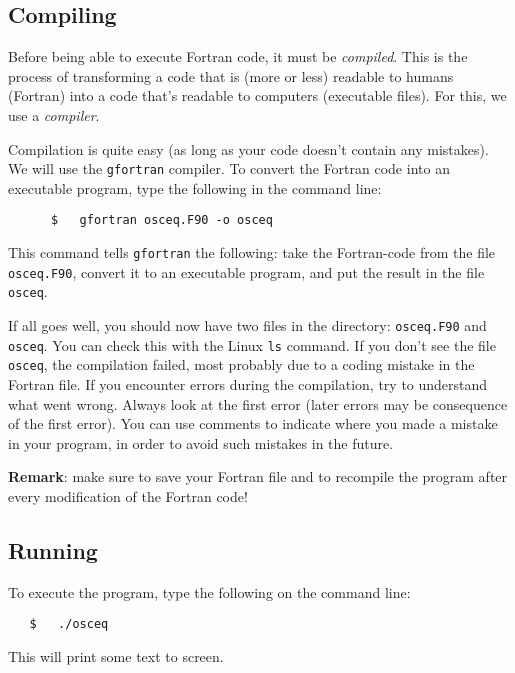 \documentclass[a4paper]{article}
\begin{document}
\subsection{Compiling\label{sec:compile}}
%
\par
Before being able to execute Fortran code, it must be \emph{compiled}. This is the process of transforming a code that is (more or less) readable to humans (Fortran) into a code that's readable to computers (executable files). For this, we use a \emph{compiler}.
%
\par
Compilation is quite easy (as long as your code doesn't contain any mistakes). We will use the \texttt{gfortran} compiler. To convert the Fortran code into an executable program, type the following in the command line:
%
\begin{verbatim}
	  $   gfortran osceq.F90 -o osceq
\end{verbatim}
%
This command tells \verb+gfortran+ the following: take the Fortran-code from the file \verb+osceq.F90+, convert it to an executable program, and put the result in the file \verb+osceq+.
%
\par
If all goes well, you should now have two files in the directory: \verb+osceq.F90+ and \verb+osceq+. You can check this with the Linux \verb+ls+ command. If you don't see the file \verb+osceq+, the compilation failed, most probably due to a coding mistake in the Fortran file. If you encounter errors during the compilation, try to understand what went wrong. Always look at the first error (later errors may be consequence of the first error). You can use comments to indicate where you made a mistake in your program, in order to avoid such mistakes in the future.
%
\par
\textbf{Remark}: make sure to save your Fortran file and to recompile the program after every modification of the Fortran code!
%
\subsection{Running\label{sec:run}}
%
\par
To execute the program, type the following on the command line:
%
\begin{verbatim}
   $   ./osceq
\end{verbatim}
%
This will print some text to screen.
%
\end{document}
